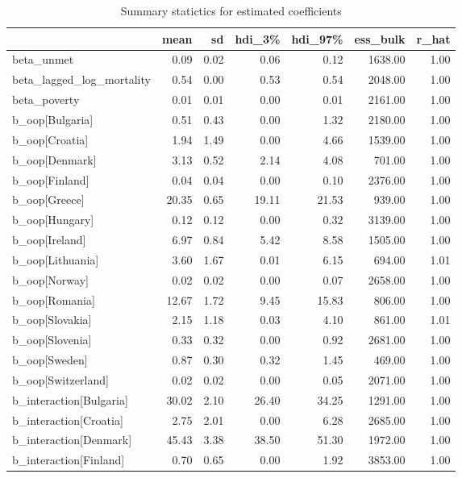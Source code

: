 \documentclass[a4paper,12pt]{article}
\begin{document}
\begin{table}[htbp]
\caption{\label{tab:estimated_coefficients}Summary statictics for estimated coefficients}
\centering
\begin{tabular}{lrrrrrr}
 & mean & sd & hdi\_3\% & hdi\_97\% & ess\_bulk & r\_hat\\[0pt]
\hline
beta\_unmet & 0.09 & 0.02 & 0.06 & 0.12 & 1638.00 & 1.00\\[0pt]
beta\_lagged\_log\_mortality & 0.54 & 0.00 & 0.53 & 0.54 & 2048.00 & 1.00\\[0pt]
beta\_poverty & 0.01 & 0.01 & 0.00 & 0.01 & 2161.00 & 1.00\\[0pt]
b\_oop[Bulgaria] & 0.51 & 0.43 & 0.00 & 1.32 & 2180.00 & 1.00\\[0pt]
b\_oop[Croatia] & 1.94 & 1.49 & 0.00 & 4.66 & 1539.00 & 1.00\\[0pt]
b\_oop[Denmark] & 3.13 & 0.52 & 2.14 & 4.08 & 701.00 & 1.00\\[0pt]
b\_oop[Finland] & 0.04 & 0.04 & 0.00 & 0.10 & 2376.00 & 1.00\\[0pt]
b\_oop[Greece] & 20.35 & 0.65 & 19.11 & 21.53 & 939.00 & 1.00\\[0pt]
b\_oop[Hungary] & 0.12 & 0.12 & 0.00 & 0.32 & 3139.00 & 1.00\\[0pt]
b\_oop[Ireland] & 6.97 & 0.84 & 5.42 & 8.58 & 1505.00 & 1.00\\[0pt]
b\_oop[Lithuania] & 3.60 & 1.67 & 0.01 & 6.15 & 694.00 & 1.01\\[0pt]
b\_oop[Norway] & 0.02 & 0.02 & 0.00 & 0.07 & 2658.00 & 1.00\\[0pt]
b\_oop[Romania] & 12.67 & 1.72 & 9.45 & 15.83 & 806.00 & 1.00\\[0pt]
b\_oop[Slovakia] & 2.15 & 1.18 & 0.03 & 4.10 & 861.00 & 1.01\\[0pt]
b\_oop[Slovenia] & 0.33 & 0.32 & 0.00 & 0.92 & 2681.00 & 1.00\\[0pt]
b\_oop[Sweden] & 0.87 & 0.30 & 0.32 & 1.45 & 469.00 & 1.00\\[0pt]
b\_oop[Switzerland] & 0.02 & 0.02 & 0.00 & 0.05 & 2071.00 & 1.00\\[0pt]
b\_interaction[Bulgaria] & 30.02 & 2.10 & 26.40 & 34.25 & 1291.00 & 1.00\\[0pt]
b\_interaction[Croatia] & 2.75 & 2.01 & 0.00 & 6.28 & 2685.00 & 1.00\\[0pt]
b\_interaction[Denmark] & 45.43 & 3.38 & 38.50 & 51.30 & 1972.00 & 1.00\\[0pt]
b\_interaction[Finland] & 0.70 & 0.65 & 0.00 & 1.92 & 3853.00 & 1.00\\[0pt]

\end{tabular}
\end{table}
\end{document}
